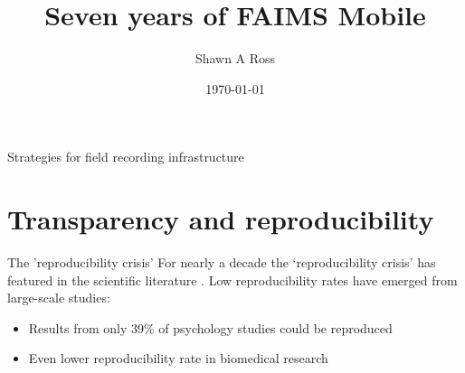 \documentclass[aspectratio=169, 12pt]{beamer} %
\title{Seven years of FAIMS Mobile} %
\author{Shawn A Ross}               %
\institute{Office of the Deputy Vice-Chancellor (Research)}         %
\date{\today}                 %
\begin{document}

\maketitle

  

\begin{frame}{Strategies for field recording infrastructure}
  \tableofcontents
\end{frame}

%

\section{Transparency and reproducibility}

\begin{frame}{The 'reproducibility crisis'}
  For nearly a decade the ‘reproducibility crisis’ has featured in the scientific literature \cite{Jasny2011-bw, Baker2016-cf, Munafo2017-bj}. Low reproducibility rates have emerged from large-scale studies:
    \begin{itemize}
        \item Results from only 39\% of psychology studies could be reproduced \cite{Open_Science_Collaboration2015-vf}
        \item Even lower reproducibility rate in biomedical research \cite{Begley2012-xt,Prinz2011-za}
    \end{itemize}
\end{frame}
\end{document}
